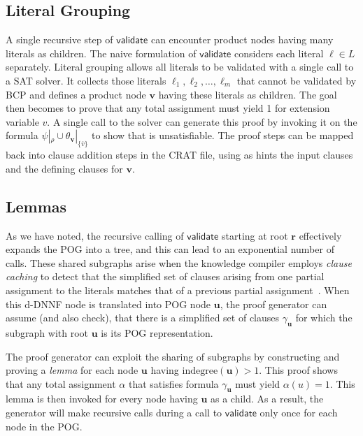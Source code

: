 \documentclass[letterpaper,USenglish,cleveref, autoref, thm-restate]{lipics-v2021}
\newcommand{\obar}[1]{\overline{#1}}
\newcommand{\lit}{\ell}
\newcommand{\assign}{\alpha}
\newcommand{\passign}{\rho}
\newcommand{\indegree}{\textrm{indegree}}
\newcommand{\validate}{\textsf{validate}}
\newcommand{\makenode}[1]{\mathbf{#1}}
\newcommand{\nodeu}{\makenode{u}}
\newcommand{\nodev}{\makenode{v}}
\newcommand{\noder}{\makenode{r}}
\newcommand{\simplify}[2]{#1|_{#2}}
\begin{document}
\label{app:optimizations}

\subsection{Literal Grouping}

A single recursive step of $\validate$ can encounter product nodes
having many literals as children.  The naive formulation of $\validate$
considers each literal $\lit \in L$ separately.
Literal grouping allows all literals to be validated with a single call to a SAT solver.
It collects those literals
$\lit_1, \lit_2, \ldots, \lit_m$ that cannot be validated by BCP and defines a
product node $\nodev$ having these literals as children.  The goal
then becomes to prove that any total assignment must yield 1 for extension
variable $v$.  A single call to the solver can generate this proof by invoking it on the formula
  $\simplify{\psi}{\passign} \cup \simplify{\theta_{\nodev}}{\{ \obar{v} \}}$ to show that is unsatisfiable.
  The proof steps can be mapped back into clause addition steps in the CRAT file, using as hints the
  input clauses and the defining clauses for $\nodev$.


\subsection{Lemmas}
\label{app:lemma}

As we have noted, the recursive calling of $\validate$ starting at
root $\noder$ effectively expands the POG into a tree, and this can
lead to an exponential number of calls.
These shared subgraphs arise when the knowledge compiler employs {\em clause caching}
to detect that the simplified set of
clauses arising from one partial assignment to the literals matches that
of a previous partial assignment~\cite{darwiche:aaai:2002}.
When this d-DNNF node is translated into POG
node $\nodeu$, the proof generator can assume (and also check), that
there is a simplified set of clauses $\gamma_{\nodeu}$
for which the subgraph with root $\nodeu$ is its POG representation.

The proof generator can exploit the sharing of subgraphs
by constructing and proving a {\em lemma} for each node
$\nodeu$ having $\indegree(\nodeu) > 1$.  This proof shows that any
total assignment $\assign$ that satisfies formula $\gamma_{\nodeu}$ must yield
$\assign(u) = 1$.  This lemma is then invoked for every node having
$\nodeu$ as a child.
As a result, the generator will make recursive calls during a call to $\validate$ only once for each node in the POG\@.
\end{document}
